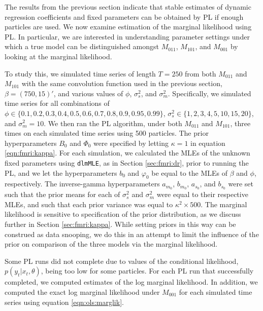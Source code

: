 The results from the previous section indicate that stable estimates of dynamic regression coefficients and fixed parameters can be obtained by PL if enough particles are used. We now examine estimation of the marginal likelihood using PL. In particular, we are interested in understanding parameter settings under which a true model can be distinguished amongst $M_{011}$, $M_{101}$, and $M_{001}$ by looking at the marginal likelihood.

To study this, we simulated time series of length $T = 250$ from both $M_{011}$ and $M_{101}$ with the same convolution function used in the previous section, $\beta = (750,15)'$, and various values of $\phi$, $\sigma^2_s$, and $\sigma^2_m$. Specifically, we simulated time series for all combinations of $\phi \in \{0.1,0.2,0.3,0.4,0.5,0.6,0.7,0.8,0.9,0.95,0.99\}$, $\sigma^2_s \in \{1,2,3,4,5,10,15,20\}$, and $\sigma^2_m = 10$. We then ran the PL algorithm, under both $M_{011}$ and $M_{101}$, three times on each simulated time series using 500 particles. The prior hyperparameters $B_0$ and $\Phi_0$ were specified by letting $\kappa = 1$ in equation \eqref{eqn:fmri:kappa}. For each simulation, we calculated the MLEs of the unknown fixed parameters using {\tt dlmMLE}, as in Section \ref{sec:fmri:dr}, prior to running the PL, and we let the hyperparameters $b_0$ and $\varphi_0$ be equal to the MLEs of $\beta$ and $\phi$, respectively. The inverse-gamma hyperparameters $a_{m_0}$, $b_{m_0}$, $a_{s_0}$, and $b_{s_0}$ were set such that the prior means for each of $\sigma^2_s$ and $\sigma^2_m$ were equal to their respective MLEs, and such that each prior variance was equal to $\kappa^2\times500$. The marginal likelihood is sensitive to specification of the prior distribution, as we discuss further in Section \ref{sec:fmri:kappa}. While setting priors in this way can be construed as data snooping, we do this in an attempt to limit the influence of the prior on comparison of the three models via the marginal likelihood.

Some PL runs did not complete due to values of the conditional likelihood, $p(y_t|x_t,\theta)$, being too low for some particles. For each PL run that successfully completed, we computed estimates of the log marginal likelihood. In addition, we computed the exact log marginal likelihood under $M_{001}$ for each simulated time series using equation \eqref{eqn:ols:marglik}.

